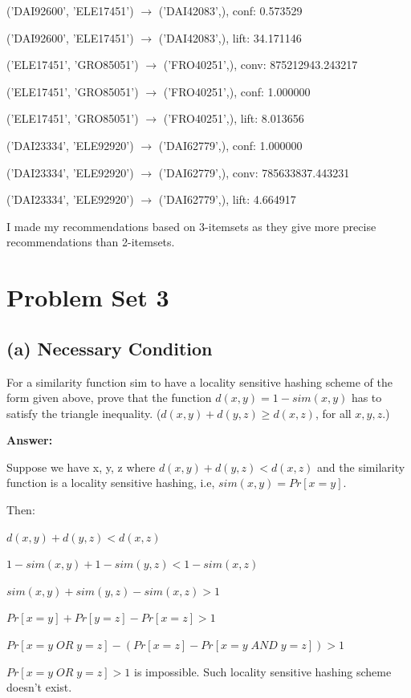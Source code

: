 \documentclass{article}
\begin{document}
('DAI92600', 'ELE17451') $\rightarrow$ ('DAI42083',), conf: 0.573529

('DAI92600', 'ELE17451') $\rightarrow$ ('DAI42083',), lift: 34.171146


('ELE17451', 'GRO85051') $\rightarrow$ ('FRO40251',), conv: 875212943.243217

('ELE17451', 'GRO85051') $\rightarrow$ ('FRO40251',), conf: 1.000000

('ELE17451', 'GRO85051') $\rightarrow$ ('FRO40251',), lift: 8.013656


('DAI23334', 'ELE92920') $\rightarrow$ ('DAI62779',), conf: 1.000000

('DAI23334', 'ELE92920') $\rightarrow$ ('DAI62779',), conv: 785633837.443231

('DAI23334', 'ELE92920') $\rightarrow$ ('DAI62779',), lift: 4.664917


I made my recommendations based on 3-itemsets as they give more precise recommendations than 2-itemsets.


\section{Problem Set 3}

\subsection{(a) Necessary Condition}

For a similarity function sim to have a locality sensitive hashing scheme of the form given
above, prove that the function $d(x, y) = 1 - sim(x, y)$ has to satisfy the triangle inequality.
 ($d(x, y) + d(y, z) \ge d(x, z)$, for all $x, y, z.$)

\textbf{Answer:}

Suppose we have x, y, z where $d(x, y) + d(y, z) < d(x, z)$ and the similarity function is a locality sensitive hashing, i.e, $sim(x, y) = Pr[x = y]$.

Then:

$d(x, y) + d(y, z) < d(x, z)$

$1 - sim(x, y) + 1 - sim(y, z) < 1 - sim(x, z)$

$sim(x, y) + sim(y, z) - sim(x, z) > 1$

$Pr[x = y] + Pr[y = z] - Pr[x = z] > 1$

$Pr[x = y\;OR\;y = z] - (Pr[x = z] - Pr[x = y\;AND\;y = z]) > 1$

$Pr[x = y\;OR\;y = z] > 1$ is impossible. Such locality sensitive hashing scheme doesn't exist.
\end{document}
